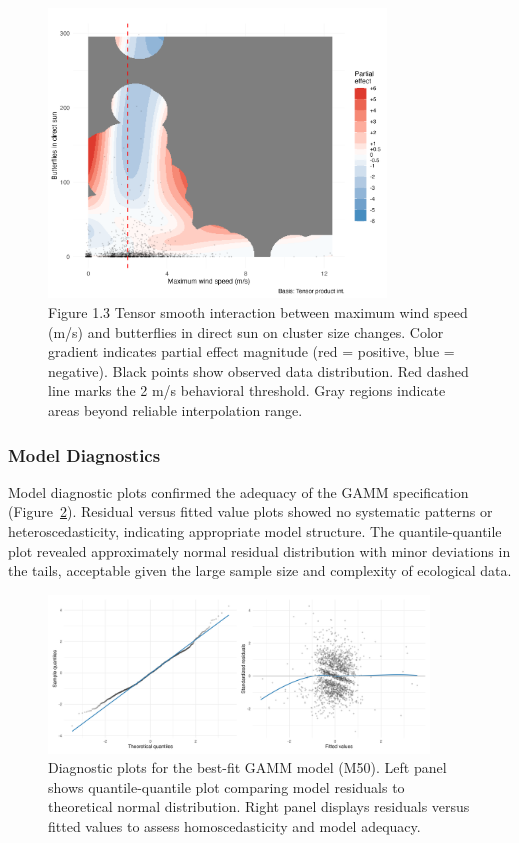 \begin{figure}[htbp]
    \centering
    \includegraphics[width=0.8\textwidth]{supplemental/results/30_min/figures/interaction_wind_x_sun_binned.png}
    \caption{Figure 1.3 Tensor smooth interaction between maximum wind speed (m/s) and butterflies in direct sun on cluster size changes. Color gradient indicates partial effect magnitude (red = positive, blue = negative). Black points show observed data distribution. Red dashed line marks the 2 m/s behavioral threshold. Gray regions indicate areas beyond reliable interpolation range.}
    \label{fig:interaction_wind_sun}
\end{figure}

\subsubsection{Model Diagnostics}

Model diagnostic plots confirmed the adequacy of the GAMM specification (Figure~\ref{fig:model_diagnostics_30min}). Residual versus fitted value plots showed no systematic patterns or heteroscedasticity, indicating appropriate model structure. The quantile-quantile plot revealed approximately normal residual distribution with minor deviations in the tails, acceptable given the large sample size and complexity of ecological data.

\begin{figure}[htbp]
    \centering
    \includegraphics[width=0.9\textwidth]{supplemental/results/30_min/figures/diag_qq_and_residuals_1x2.png}
    \caption{Diagnostic plots for the best-fit GAMM model (M50). Left panel shows quantile-quantile plot comparing model residuals to theoretical normal distribution. Right panel displays residuals versus fitted values to assess homoscedasticity and model adequacy.}
    \label{fig:model_diagnostics_30min}
\end{figure}

